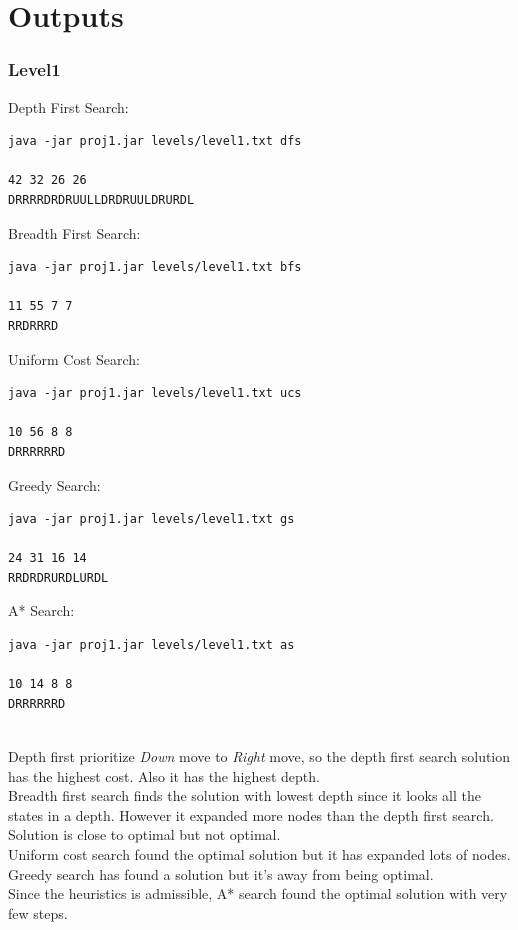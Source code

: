 \documentclass[12pt]{article}
\begin{document}
\section{Outputs}

\subsubsection*{Level1}
Depth First Search:
\begin{lstlisting}[style=terminalstyle]
java -jar proj1.jar levels/level1.txt dfs

42 32 26 26
DRRRRDRDRUULLDRDRUULDRURDL
\end{lstlisting}
Breadth First Search:
\begin{lstlisting}[style=terminalstyle]
java -jar proj1.jar levels/level1.txt bfs

11 55 7 7
RRDRRRD
\end{lstlisting}
Uniform Cost Search:
\begin{lstlisting}[style=terminalstyle]
java -jar proj1.jar levels/level1.txt ucs

10 56 8 8
DRRRRRRD
\end{lstlisting}
Greedy Search:
\begin{lstlisting}[style=terminalstyle]
java -jar proj1.jar levels/level1.txt gs

24 31 16 14
RRDRDRURDLURDL
\end{lstlisting}
A* Search:
\begin{lstlisting}[style=terminalstyle]
java -jar proj1.jar levels/level1.txt as

10 14 8 8
DRRRRRRD
\end{lstlisting}
\\
Depth first prioritize \textit{Down} move to \textit{Right} move, so the depth first search solution has the highest cost. Also it has the highest depth.\\
Breadth first search finds the solution with lowest depth since it looks all the states in a depth. However it expanded more nodes than the depth first search. Solution is close to optimal but not optimal.\\
Uniform cost search found the optimal solution but it has expanded lots of nodes.\\
Greedy search has found a solution but it's away from being optimal.\\
Since the heuristics is admissible, A* search found the optimal solution with very few steps.
\end{document}
